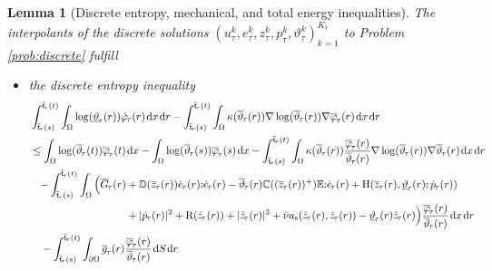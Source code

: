 \documentclass[a4paper,10pt,reqno]{amsart}
\numberwithin{equation}{section}
\numberwithin{equation}{section}
\newtheorem{lemma}[theorem]{Lemma}
\def\dd{\;\!\mathrm{d}} %
\newcommand{\teta}{\vartheta}
\newcommand{\piecewiseConstant}[2]{\overline{#1}_{\kern-1pt#2}}
\newcommand{\pwc}{\piecewiseConstant}
\newcommand{\upiecewiseConstant}[2]{\underline{#1}_{\kern-1pt#2}}
\newcommand{\upwc}{\upiecewiseConstant}
\newcommand{\piecewiseLinear}[2]{{#1}_{\kern-1pt#2}}
\newcommand{\pwl}{\piecewiseLinear}
\newcommand{\bbC}{\mathbb{C}}
\newcommand{\bbD}{\mathbb{D}}
\newcommand{\bbE}{\mathbb{E}}
\newcommand{\condu}{\kappa}
\newcommand{\dip}[3]{\mathrm{H}(#1,#2;#3)}
\newcommand{\did}[1]{\mathrm{R}(#1)}
\newcommand{\ass}{a_{\mathrm{s}}}
\newcommand{\utau}[1]{u_\tau^{#1}}
\newcommand{\ptau}[1]{p_\tau^{#1}}
\newcommand{\ztau}[1]{z_\tau^{#1}}
\newcommand{\etau}[1]{e_\tau^{#1}}
\newcommand{\tetau}[1]{\teta_\tau^{#1}}
\begin{document}
  \begin{lemma}[Discrete entropy, mechanical, and  total energy inequalities]
\label{lemma:discr-enid}
The interpolants of the   discrete solutions
 $(\utau{k}, \etau k, \ztau k, \ptau{k}, \tetau{k})_{k=1}^{K_\tau}$ to Problem \ref{prob:discrete}
 fulfill
 \begin{itemize}
 \item[-]
  the \emph{discrete} entropy inequality 
 \begin{equation}\label{entropy-ineq-discr}
\begin{aligned}
& \int_{\pwc{\mathsf{t}}{\tau}(s)}^{\pwc{\mathsf{t}}{\tau}(t)}
\int_\Omega \log(\upwc\teta\tau (r)) 
\pwl {\dot\varphi}\tau (r) \dd x \dd r - \int_{\pwc{\mathsf{t}}{\tau}(s)}^{\pwc{\mathsf{t}}{\tau}(t)}  \int_\Omega  \condu(\pwc\teta\tau (r)) \nabla \log(\pwc\teta\tau(r))  \nabla \pwc\varphi\tau(r)  \dd x \dd r \\ & 
\leq \int_\Omega \log(\pwc\teta\tau(t))%
\pwc\varphi\tau(t) \dd x - \int_\Omega
\log(\pwc\teta\tau(s)) %
\pwc\varphi\tau(s) \dd x
 -  \int_{\pwc{\mathsf{t}}{\tau}(s)}^{\pwc{\mathsf{t}}{\tau}(t)}  \int_\Omega \condu(\pwc \teta\tau(r)) \frac{\pwc\varphi\tau(r)}{\pwc \teta\tau(r)}
\nabla \log(\pwc \teta\tau(r)) \nabla \pwc \teta\tau (r) \dd x \dd r\\ & 
\begin{aligned}
\quad 
 -
  \int_{\pwc{\mathsf{t}}{\tau}(s)}^{\pwc{\mathsf{t}}{\tau}(t)}   \int_\Omega \Big( \pwc G{\tau} (r)    & +
    \bbD(\pwc z\tau(r)) \pwl{\dot e}\tau (r) {:} \pwl{\dot e}\tau(r) - \pwc\teta\tau(r) \bbC((\pwc z\tau (r))^+) \bbE  {:}    \pwl{\dot e}\tau(r) 
   + \dip{\pwc z\tau(r)}{\upwc \teta\tau(r)}{ \pwl{\dot p}\tau(r)}  
   \\
   & + |\pwl{\dot p}\tau(r)|^2   + \did {\pwl{\dot z}\tau(r)} + |\pwl{\dot z}\tau(r)|^2 +\bar{\nu} \ass(\pwl{\dot z}\tau(r),\pwl{\dot z}\tau(r)) - \upwc \teta\tau(r) \pwl{\dot z}\tau(r)  
  \Big)
 \frac{\pwc\varphi\tau(r)}{\pwc\teta\tau(r)} \dd x \dd r 
 \end{aligned}
   \\ & \quad -  \int_{\pwc{\mathsf{t}}{\tau}(s)}^{\pwc{\mathsf{t}}{\tau}(t)}   \int_{\partial\Omega} \pwc g{\tau} (r)   \frac{\pwc\varphi\tau(r)}{\pwc\teta\tau(r)} \dd S \dd r

\end{aligned}
\end{equation}
\end{itemize}
\end{lemma}
\end{document}
